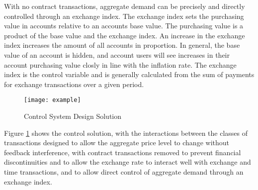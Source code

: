 With no contract transactions, aggregate demand can be precisely and directly controlled through an
exchange index.  The exchange index sets the purchasing value in accounts relative to an accounts
base value. The purchasing value is a product of the base value and the exchange index. An increase
in the exchange index increases the amount of all accounts in proportion. In general, the base value
of an account is hidden, and account users will see increases in their account purchasing value
closly in line with the inflation rate. The exchange index is the control variable and is generally
calculated from the sum of payments for exchange transactions over a given period.  

\begin{figure}
\centering
\texttt{[image: example]}
\caption{Control System Design Solution}
\label{fig:control_solution}
\end{figure}

Figure \ref{fig:control_solution} shows the control solution, with the interactions between the
classes of transactions designed to allow the aggregate price level to change without feedback
interference, with contract transactions removed to prevent financial discontinuities and to allow
the exchange rate to interact well with exchange and time transactions, and to allow direct control
of aggregate demand through an exchange index.


